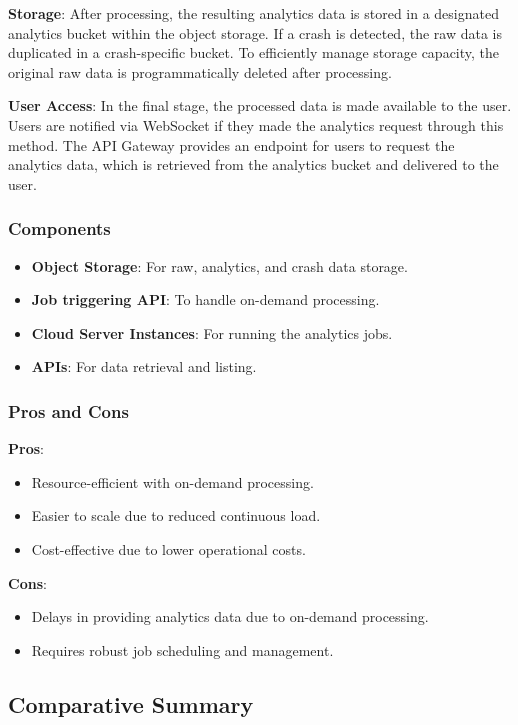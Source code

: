 \textbf{Storage}:  
After processing, the resulting analytics data is stored in a designated analytics bucket within the object storage. If a crash is detected, the raw data is duplicated in a crash-specific bucket. To efficiently manage storage capacity, the original raw data is programmatically deleted after processing.

\textbf{User Access}:  
In the final stage, the processed data is made available to the user. Users are notified via WebSocket if they made the analytics request through this method. The API Gateway provides an endpoint for users to request the analytics data, which is retrieved from the analytics bucket and delivered to the user.

\subsubsection{Components}
\begin{itemize}
    \item \textbf{ Object Storage}: For raw, analytics, and crash data storage.
    \item \textbf{Job triggering API}: To handle on-demand processing.
    \item \textbf{Cloud Server Instances}: For running the analytics jobs.
    \item \textbf{APIs}: For data retrieval and listing.
\end{itemize}

\subsubsection{Pros and Cons}

\textbf{Pros}:
\begin{itemize}
    \item Resource-efficient with on-demand processing.
    \item Easier to scale due to reduced continuous load.
    \item Cost-effective due to lower operational costs.
\end{itemize}

\textbf{Cons}:
\begin{itemize}
    \item Delays in providing analytics data due to on-demand processing.
    \item Requires robust job scheduling and management.
\end{itemize}

\subsection{Comparative Summary}

